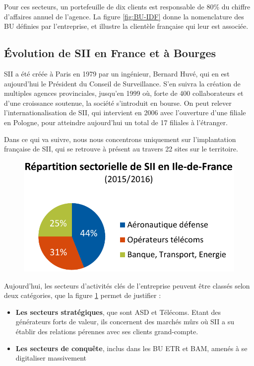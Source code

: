 Pour ces secteurs, un portefeuille de dix clients est responsable de 80\% du chiffre d'affaires annuel de l'agence. 
La figure \ref{fig:BU-IDF} donne la nomenclature des \gls{BU} définies par l'entreprise, et illustre la clientèle française qui leur est associée.  

\subsection{\'{E}volution de SII en France et à Bourges}

SII a été créée à Paris en 1979 par un ingénieur, Bernard Huvé, qui en est aujourd'hui le Président du Conseil de Surveillance. 
S'en suivra la création de multiples agences provinciales, jusqu'en 1999 où, forte de 400 collaborateurs et d'une croissance soutenue, la société s'introduit en bourse.  
On peut relever l'internationalisation de SII, qui intervient en 2006 avec l'ouverture d'une filiale en Pologne, pour atteindre aujourd'hui un total de 17 filiales à l'étranger\cite{Bib_exercice_2015_2016}.  

Dans ce qui va suivre, nous nous concentrons uniquement sur l'implantation française de SII, qui se retrouve à présent au travers 22 sites sur le territoire.  

\begin{figure}[h]
    \centering
    \includegraphics[width=.5\linewidth]{figures/BU-IDF}
    \label{fig:Rep-sectorielle}
\end{figure}

Aujourd'hui, les secteurs d'activités clés de l'entreprise peuvent être classés selon deux catégories\cite{Bib_memento_ag_idf}, que la figure \ref{fig:Rep-sectorielle} permet de justifier : 

\begin{itemize}
  \item \textbf{Les secteurs stratégiques}, que sont \gls{ASD} et Télécoms. Etant des générateurs forts de valeur, ils concernent des marchés mûrs où SII a su établir des relations pérennes avec ses clients grand-compte. 
  \item \textbf{Les secteurs de conquête}, inclus dans les \gls{BU} \gls{ETR} et \gls{BAM}, amenés à se digitaliser massivement
\end{itemize}


